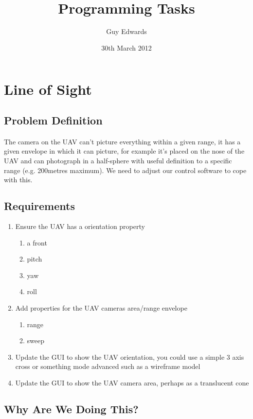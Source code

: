 \documentclass[11pt]{book}
\title{\textbf{Programming Tasks}}
\author{Guy Edwards}
\date{30th March 2012}
\begin{document}
\section{Line of Sight}

\subsection{Problem Definition}

\paragraph{} The camera on the UAV can't picture everything within a given
range, it has a given envelope in which it can picture, for example it's
placed on the nose of the UAV and can photograph in a half-sphere with useful
definition to a specific range (e.g. 200metres maximum). We need to adjust our
control software to cope with this.

\subsection{Requirements}

\begin{enumerate}
\item Ensure the UAV has a orientation property
     \begin{enumerate}
         \item a front
         \item pitch
         \item yaw
         \item roll
     \end{enumerate}
\item Add properties for the UAV cameras area/range envelope
     \begin{enumerate}
         \item range
         \item sweep
     \end{enumerate}
\item Update the GUI to show the UAV orientation, you could use a simple 3 axis cross or something mode advanced such as a wireframe model
\item Update the GUI to show the UAV camera area, perhaps as a translucent cone
\end{enumerate}

\subsection{Why Are We Doing This?}
\end{document}
